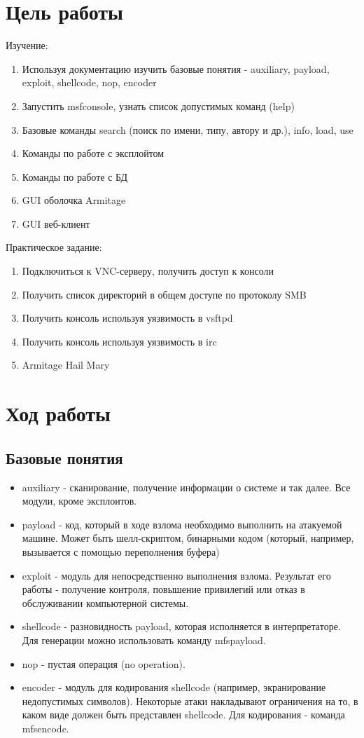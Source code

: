 \section{Цель работы}
Изучение:
\begin{enumerate}
	\item Используя документацию изучить базовые понятия - auxiliary,
	payload, exploit, shellcode, nop, encoder
	\item Запустить msfconsole, узнать список допустимых команд (help)
	\item Базовые команды search (поиск по имени, типу, автору и др.),
	info, load, use
	\item Команды по работе с эксплойтом
	\item Команды по работе с БД
	\item GUI оболочка Armitage
	\item GUI веб-клиент
\end{enumerate}

Практическое задание:
\begin{enumerate}
\item Подключиться к VNC-серверу, получить доступ к консоли
\item Получить список директорий в общем доступе по протоколу SMB
\item Получить консоль используя уязвимость в vsftpd
\item Получить консоль используя уязвимость в irc
\item Armitage Hail Mary
\end{enumerate}

\section{Ход работы}

\subsection{Базовые понятия}
\begin{itemize}
	\item auxiliary - сканирование, получение информации о системе и так далее. Все модули, кроме эксплоитов.
	\item payload - код, который в ходе взлома необходимо выполнить на атакуемой машине. Может быть шелл-скриптом, бинарными кодом (который, например, вызывается с помощью переполнения буфера)
	\item exploit - модуль для непосредственно выполнения взлома. Результат его работы - получение контроля, повышение привилегий или отказ в обслуживании компьютерной системы.
	\item shellcode - разновидность payload, которая исполняется в интерпретаторе. Для генерации можно использовать команду mfspayload.
	\item nop - пустая операция (no operation).
	\item encoder - модуль для кодирования shellcode (например, экранирование недопустимых символов). Некоторые атаки накладывают ограничения на то, в каком виде должен быть представлен shellcode. Для кодирования - команда mfsencode.
\end{itemize}

